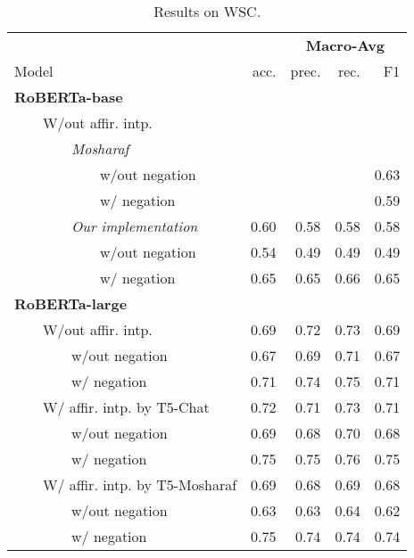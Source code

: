 

\begin{table*}
\centering
\begin{tabular}{lrrrr}
\toprule
&& \multicolumn{3}{c}{\textbf{Macro-Avg}} \\
Model & acc. & prec. & rec. & F1 \\
\midrule
\textbf{RoBERTa-base} \\
~~~~W/out affir. intp. \\
~~~~~~~~\textit{Mosharaf} \\
~~~~~~~~~~~~w/out negation &&&&0.63\\ 
~~~~~~~~~~~~w/ negation &&&&0.59\\ 
\midrule
~~~~~~~~\textit{Our implementation}  & 0.60 & 0.58 & 0.58 & 0.58\\
~~~~~~~~~~~~w/out negation   & 0.54 & 0.49 & 0.49 & 0.49 \\
~~~~~~~~~~~~w/ negation & 0.65 & 0.65 & 0.66 & 0.65 \\ 
\bottomrule
\textbf{RoBERTa-large} \\
~~~~W/out affir. intp.  & 0.69 & 0.72 & 0.73 & 0.69\\
~~~~~~~~w/out negation  & 0.67 & 0.69 & 0.71 & 0.67\\ 
~~~~~~~~w/ negation  & 0.71 & 0.74 & 0.75 & 0.71\\ 
\midrule
~~~~W/ affir. intp. by T5-Chat & 0.72 & 0.71 & 0.73 & 0.71 \\
~~~~~~~~w/out negation    & 0.69 & 0.68 & 0.70 & 0.68 \\ 
~~~~~~~~w/ negation  & 0.75 & 0.75 & 0.76 & 0.75 \\ 
\midrule
~~~~W/ affir. intp. by T5-Mosharaf & 0.69 & 0.68 & 0.69 & 0.68\\
~~~~~~~~w/out negation & 0.63 & 0.63 & 0.64 & 0.62\\ 
~~~~~~~~w/ negation& 0.75 & 0.74 & 0.74 & 0.74 \\ 
\bottomrule
\end{tabular}
\caption{Results on WSC.}
\end{table*}